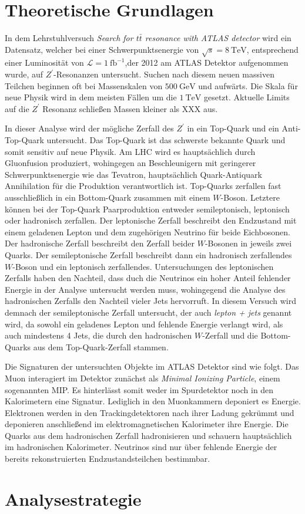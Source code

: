 \section{Theoretische Grundlagen}

In dem Lehrstuhlversuch \textit{Search for $t\bar{t}$ resonance with ATLAS detector} wird ein Datensatz, welcher bei 
einer Schwerpunktsenergie von $\sqrt{s} = \SI{8}{\tera\electronvolt}$, entsprechend einer Luminosität von 
$\mathcal{L} = \SI{1}{\femto\barn}^{-1}$,der 2012 am ATLAS Detektor aufgenommen wurde, auf $Z^\prime$-Resonanzen untersucht. 
Suchen nach diesem neuen massiven Teilchen beginnen oft bei Massenskalen von $\SI{500}{\giga\electronvolt}$ und aufwärts. Die 
Skala für neue Physik wird in dem meisten Fällen um die $\SI{1}{\tera\electronvolt}$ gesetzt. Aktuelle Limits auf die 
$Z^\prime$ Resonanz schließen Massen kleiner als XXX aus. \par 

In dieser Analyse wird der mögliche Zerfall des $Z^\prime$ in ein Top-Quark und ein Anti-Top-Quark untersucht. Das Top-Quark 
ist das schwerste bekannte Quark und somit sensitiv auf neue Physik. Am LHC wird es hauptsächlich durch Gluonfusion 
produziert, wohingegen an Beschleunigern mit geringerer Schwerpunktsenergie wie das Tevatron, hauptsächlich Quark-Antiquark 
Annihilation für die Produktion verantwortlich ist. Top-Quarks 
zerfallen fast ausschließlich in ein Bottom-Quark zusammen mit einem $W$-Boson. Letztere können bei der 
Top-Quark Paarproduktion entweder semileptonisch, 
leptonisch oder hadronisch zerfallen. Der leptonische Zerfall beschreibt den Endzustand mit einem geladenen Lepton und 
dem zugehörigen Neutrino für beide Eichbosonen. Der hadronische Zerfall beschreibt den Zerfall beider $W$-Bosonen in 
jeweils zwei Quarks. Der semileptonische Zerfall beschreibt dann ein hadronisch zerfallendes $W$-Boson und ein leptonisch 
zerfallendes. Untersuchungen des leptonischen Zerfalls haben den Nachteil, dass duch die Neutrinos ein hoher Anteil fehlender 
Energie in der Analyse untersucht werden muss, wohingegend die Analyse des hadronischen Zerfalls den Nachteil vieler Jets 
hervorruft. In diesem Versuch wird demnach der semileptonische Zerfall untersucht, der auch \textit{lepton + jets} genannt wird, 
da sowohl ein geladenes Lepton und fehlende Energie verlangt wird, als auch mindestens 4 Jets, die durch den hadronischen $W$-Zerfall und die Bottom-Quarks 
aus dem Top-Quark-Zerfall stammen. \par 

Die Signaturen der untersuchten Objekte im ATLAS Detektor sind wie folgt. Das Muon interagiert im Detektor zunächst als \textit{Minimal Ionizing Particle}, 
einem sogenannten MIP. Es hinterlässt somit weder im Spurdetektor noch in den Kalorimetern eine Signatur. Lediglich in den Muonkammern deponiert es 
Energie. Elektronen werden in den Trackingdetektoren nach ihrer Ladung gekrümmt und deponieren anschließend im elektromagnetischen Kalorimeter ihre 
Energie. Die Quarks aus dem hadronischen Zerfall hadronisieren und schauern hauptsächlich im hadronischen Kalorimeter. Neutrinos sind nur über fehlende 
Energie der bereits rekonstruierten Endzustandsteilchen bestimmbar.

\section{Analysestrategie}